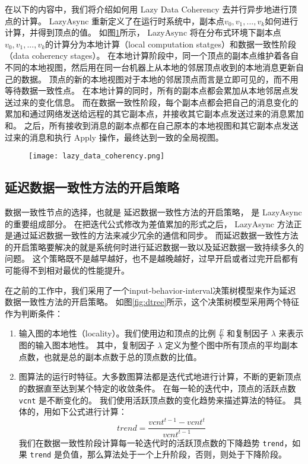 在以下的内容中，我们将介绍如何用 Lazy Data Coherency 去并行异步地进行顶点的计算。
LazyAsync 重新定义了在运行时系统中，副本点$v_0 , v_1 , ... , v_k$如何进行计算，并得到顶点的值。
如图\ref{fig:lazy_data_coherency}所示，
LazyAsync 将在分布式环境下副本点$v_0 , v_1 , ... , v_k$的计算分为本地计算（local computation statges）和数据一致性阶段（data coherency stages）。
在本地计算阶段中，同一个顶点的副本点维护着各自不同的本地视图，然后用在同一台机器上从本地的邻居顶点收到的本地消息更新自己的数据。
顶点的新的本地视图对于本地的邻居顶点而言是立即可见的，而不用等待数据一致性点。
在本地计算的同时，所有的副本点都会累加从本地邻居点发送过来的变化信息。
而在数据一致性阶段，每个副本点都会把自己的消息变化的累加和通过网络发送给远程的其它副本点，并接收其它副本点发送过来的消息累加和。
之后，所有接收到消息的副本点都在自己原本的本地视图和其它副本点发送过来的消息和执行 Apply 操作，最终达到一致的全局视图。
\begin{figure}[!htbp]
\centering
\texttt{[image: lazy\_data\_coherency.png]}
\label{fig:lazy_data_coherency}
\end{figure}

\subsection{延迟数据一致性方法的开启策略}

数据一致性节点的选择，也就是 延迟数据一致性方法的开启策略， 是 LazyAsync 的重要组成部分。
在把迭代公式修改为差值累加的形式之后， LazyAsync 方法正是通过延迟数据一致性的方法来减少冗余的通信和同步。
而延迟数据一致性方法的开启策略要解决的就是系统何时进行延迟数据一致以及延迟数据一致持续多久的问题。
这个策略既不是越早越好，也不是越晚越好，过早开启或者过完开启都有可能得不到相对最优的性能提升。


在之前的工作中，我们采用了一个input-behavior-interval决策树模型来作为延迟数据一致性方法的开启策略。
如图\ref{fig:dtree}所示，这个决策树模型采用两个特征作为判断条件：

\begin{enumerate}
  \item 输入图的本地性（locality）。我们使用边和顶点的比例 $\frac{E}{V}$ 和复制因子 $\lambda$ 来表示图的输入图本地性。
  其中，复制因子 $\lambda$ 定义为整个图中所有顶点的平均副本点数，也就是总的副本点数于总的顶点数的比值。
  \item 图算法的运行时特征。大多数图算法都是迭代式地进行计算，不断的更新顶点的数据直至达到某个特定的收敛条件。
  在每一轮的迭代中，顶点的活跃点数\verb|vcnt| 是不断变化的。
  我们使用活跃顶点数的变化趋势来描述算法的特征。
  具体的，用如下公式进行计算：
  \begin{equation}
  \label{equ:chap04:trend}
  trend = \frac{vcnt^{t-1}-vcnt^t}{vcnt^{t-1}}
  \end{equation}
  我们在数据一致性阶段计算每一轮迭代时的活跃顶点数的下降趋势 \verb|trend|，如果 \verb|trend| 是负值，那么算法处于一个上升阶段，否则，则处于下降阶段。
\end{enumerate}

